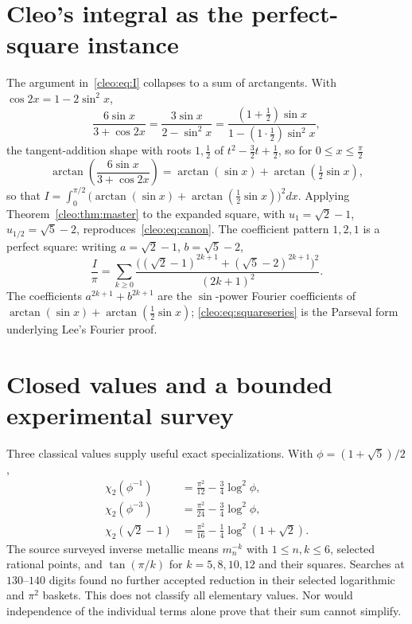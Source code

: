 \section{Cleo's integral as the perfect-square instance}\label{cleo:sec:square}
The argument in~\eqref{cleo:eq:I} collapses to a sum of arctangents. With $\cos2x=1-2\sin^2x$,
\[
  \frac{6\sin x}{3+\cos2x}=\frac{3\sin x}{2-\sin^2x}=\frac{(1+\tfrac12)\sin x}{1-(1\cdot\tfrac12)\sin^2x},
\]
the tangent-addition shape with roots $1,\tfrac12$ of $t^2-\tfrac32t+\tfrac12$, so for $0\le x\le\frac\pi2$
\begin{equation}\label{cleo:eq:collapse}
  \arctan\!\left(\frac{6\sin x}{3+\cos2x}\right)=\arctan(\sin x)+\arctan(\tfrac12\sin x),
\end{equation}
so that $I=\int_0^{\pi/2}\bigl(\arctan(\sin x)+\arctan(\tfrac12\sin x)\bigr)^2 dx$.
Applying Theorem~\ref{cleo:thm:master} to the expanded square, with $u_1=\sqrt2-1$, $u_{1/2}=\sqrt5-2$,
reproduces~\eqref{cleo:eq:canon}. The coefficient pattern $1,2,1$ is a perfect square: writing $a=\sqrt2-1$,
$b=\sqrt5-2$,
\begin{equation}\label{cleo:eq:squareseries}
  \frac{I}{\pi}=\sum_{k\ge0}\frac{\bigl((\sqrt2-1)^{2k+1}+(\sqrt5-2)^{2k+1}\bigr)^2}{(2k+1)^2}.
\end{equation}
The coefficients $a^{2k+1}+b^{2k+1}$ are the $\sin$-power Fourier coefficients of
$\arctan(\sin x)+\arctan(\tfrac12\sin x)$; \eqref{cleo:eq:squareseries} is the Parseval form underlying Lee's
Fourier proof.

\section{Closed values and a bounded experimental survey}
Three classical values supply useful exact specializations. With
$\phi=(1+\sqrt5)/2$,
\begin{equation}\label{cleo:eq:elem}
\begin{aligned}
\chi_2(\phi^{-1})&=\frac{\pi^2}{12}-\frac34\log^2\phi,\\
\chi_2(\phi^{-3})&=\frac{\pi^2}{24}-\frac34\log^2\phi,\\
\chi_2(\sqrt2-1)&=\frac{\pi^2}{16}-\frac14\log^2(1+\sqrt2).
\end{aligned}
\end{equation}
The source surveyed inverse metallic means $m_n^{-k}$ with $1\le n,k\le6$,
selected rational points, and $\tan(\pi/k)$ for $k=5,8,10,12$ and their
squares. Searches at $130$--$140$ digits found no further accepted
reduction in their selected logarithmic and $\pi^2$ baskets. This does not
classify all elementary values. Nor would independence of the individual
terms alone prove that their sum cannot simplify.

